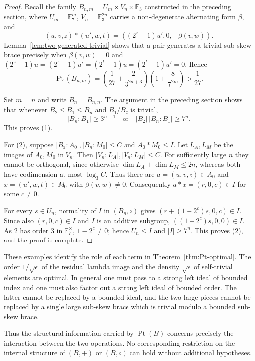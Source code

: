 \documentclass[10pt,a4paper]{amsart}
\numberwithin{equation}{section}
\newcommand{\Pt}{\operatorname{Pt} }
\begin{document}
\begin{proof}
Recall the family
$B_{n,m}=U_m\times V_n\times\mathbb F_3$ constructed in the preceding
section, where $U_m=\mathbb F_7^m$, $V_n=\mathbb F_3^{2n}$ carries a
non-degenerate alternating form $\beta$, and
$$
(u,v,z)*(u',w,t)=((2^z-1)u',0,-\beta(v,w)).
$$
Lemma~\ref{lem:two-generated-trivial} shows that a pair generates a
trivial sub-skew brace precisely when $\beta(v,w)=0$ and
$(2^z-1)u=(2^z-1)u'=(2^t-1)u=(2^t-1)u'=0$. Hence
$$
\Pt(B_{n,m})=
\left(\frac1{27}+\frac2{3^{2n+3}}\right)
\left(1+\frac8{7^{2m}}\right)>\frac1{27}.
$$

Set $m=n$ and write $B_n=B_{n,n}$. The argument in the preceding
section shows that whenever $B_2\leqslant B_1\leqslant B_n$ and
$B_1/B_2$ is trivial,
$$
|B_n:B_1|\geqslant3^{n+1}
\quad\text{or}\quad
|B_2|\,|B_n:B_1|\geqslant7^n.
$$
This proves (1).

For (2), suppose $|B_n:A_0|,|B_n:M_0|\leqslant C$ and
$A_0*M_0\leqslant I$. Let $L_A,L_M$ be the images of $A_0,M_0$ in
$V_n$. Then $|V_n:L_A|,|V_n:L_M|\leqslant C$. For sufficiently large
$n$ they cannot be orthogonal, since otherwise
$\dim L_A+\dim L_M\leqslant2n$, whereas both have codimension at most
$\log_3C$. Thus there are
$a=(u,v,z)\in A_0$ and $x=(u',w,t)\in M_0$ with $\beta(v,w)\neq0$.
Consequently $a*x=(r,0,c)\in I$ for some $c\neq0$.

For every $s\in U_n$, normality of $I$ in $(B_n,\circ)$ gives
$(r+(1-2^c)s,0,c)\in I$. Since also $(r,0,c)\in I$ and $I$ is an
additive subgroup, $((1-2^c)s,0,0)\in I$. As $2$ has order $3$ in
$\mathbb F_7^\times$, $1-2^c\neq0$; hence $U_n\leqslant I$ and
$|I|\geqslant7^n$. This proves (2), and the proof is complete.
\end{proof}

These examples identify the role of each term in
Theorem~\ref{thm:Pt-optimal}. The order $1/\sqrt{\epsilon}$ of the
residual lambda image and the density $\sqrt{\epsilon}$ of
self-trivial elements are optimal. In general one must pass to a
strong left ideal of bounded index and one must also factor out a
strong left ideal of bounded order. The latter cannot be replaced by
a bounded ideal, and the two large pieces cannot be replaced by a
single large sub-skew brace which is trivial modulo a bounded
sub-skew brace.

Thus the structural information carried by $\Pt(B)$ concerns precisely
the interaction between the two operations. No corresponding restriction
on the internal structure of $(B,+)$ or $(B,\circ)$ can hold without
additional hypotheses.
\end{document}
